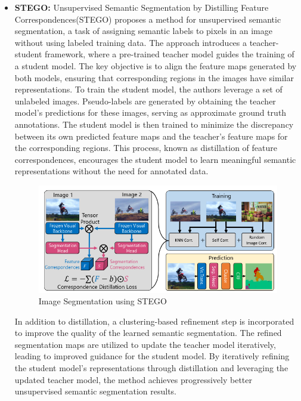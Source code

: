 \begin{itemize}
    \item \textbf{STEGO:}
    Unsupervised Semantic Segmentation by Distilling Feature Correspondences(STEGO) proposes a method for unsupervised semantic segmentation, a task of assigning semantic labels to pixels in an image without using labeled training data. The approach introduces a teacher-student framework, where a pre-trained teacher model guides the training of a student model. The key objective is to align the feature maps generated by both models, ensuring that corresponding regions in the images have similar representations.
    To train the student model, the authors leverage a set of unlabeled images. Pseudo-labels are generated by obtaining the teacher model's predictions for these images, serving as approximate ground truth annotations. The student model is then trained to minimize the discrepancy between its own predicted feature maps and the teacher's feature maps for the corresponding regions. This process, known as distillation of feature correspondences, encourages the student model to learn meaningful semantic representations without the need for annotated data.
    \begin{figure}
        \centering
        \includegraphics[scale=.5]{figures/stego2.png}
        \caption{Image Segmentation using STEGO \cite{caron2021emerging}}
        \label{fig:my_label}
    \end{figure}
    In addition to distillation, a clustering-based refinement step is incorporated to improve the quality of the learned semantic segmentation. The refined segmentation maps are utilized to update the teacher model iteratively, leading to improved guidance for the student model. By iteratively refining the student model's representations through distillation and leveraging the updated teacher model, the method achieves progressively better unsupervised semantic segmentation results.


\end{itemize}
